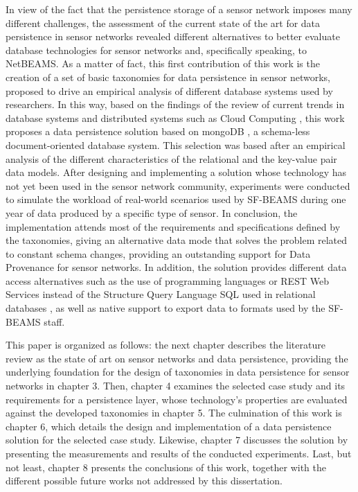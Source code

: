 In view of the fact that the persistence storage of a sensor network imposes
many different challenges, the assessment of the current state of the art for
data persistence in sensor networks revealed different alternatives to better
evaluate database technologies for sensor networks and, specifically speaking,
to NetBEAMS. As a matter of fact, this first contribution of this work is the
creation of a set of basic taxonomies for data persistence in sensor networks,
proposed to drive an empirical analysis of different database systems used by
researchers. In this way, based on the findings of the review of current trends
in database systems \cite{db-is-rdbs-dommed, db-shard-intro} and distributed
systems such as Cloud Computing \cite{cloud-comp-survey}, this work proposes a
data persistence solution based on mongoDB \cite{mongodb}, a schema-less
document-oriented database system. This selection was based after an empirical
analysis of the different characteristics of the relational
\cite{relational-model} and the key-value pair \cite{db-kvp} data models.
After designing and implementing a solution whose technology has not yet been
used in the sensor network community, experiments were conducted to simulate
the workload of real-world scenarios used by SF-BEAMS during one year of data
produced by a specific type of sensor. In conclusion, the implementation
attends most of the requirements and specifications defined by the taxonomies,
giving an alternative data mode that solves the problem related to constant
schema changes, providing an outstanding support for Data Provenance
\cite{sn-provenance} for sensor networks. In addition, the solution provides
different data access alternatives such as the use of programming languages or
REST Web Services \cite{http-rest} instead of the Structure Query Language SQL
\cite{sql} used in relational databases \cite{relational-model}, as well as
native support to export data to formats used by the SF-BEAMS staff.

This paper is organized as follows: the next chapter describes the literature
review as the state of art on sensor networks and data persistence, providing
the underlying foundation for the design of taxonomies in data persistence for
sensor networks in chapter 3. Then, chapter 4 examines the selected case study
and its requirements for a persistence layer, whose technology's properties are
evaluated against the developed taxonomies in chapter 5. The culmination of
this work is chapter 6, which details the design and implementation of a data
persistence solution for the selected case study. Likewise, chapter 7 discusses
the solution by presenting the measurements and results of the conducted
experiments. Last, but not least, chapter 8 presents the conclusions of this
work, together with the different possible future works not addressed by this
dissertation.

